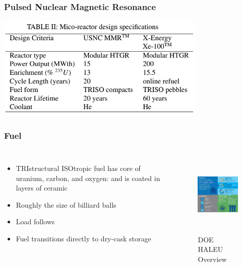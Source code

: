 \begin{frame}[fragile]
        \frametitle{Pulsed Nuclear Magnetic Resonance}
        \begin{center}
              \includegraphics[height=5cm]{./images/specifications.png}
      \end{center}
\end{frame}

\begin{frame}
  \frametitle{Fuel}
        \begin{columns}
                \column[t]{5cm}
                \begin{itemize}
                        \item TRIstructural ISOtropic fuel has core of uranium, carbon, and oxygen: and is coated in layers of ceramic
                        \item Roughly the size of billiard balls
                        \item Load follows
                        \item Fuel transitions directly to dry-cask storage
                \end{itemize}

                \column[t]{5cm}
        \begin{figure}[htbp!]
        \begin{center}
      \includegraphics[height=4cm]{./images/HALEU_overview.jpg}
    \end{center}
          \caption{DOE HALEU Overview}
    \label{fig:doe_haleu_overview}
  \end{figure}
        \end{columns}
\end{frame}

